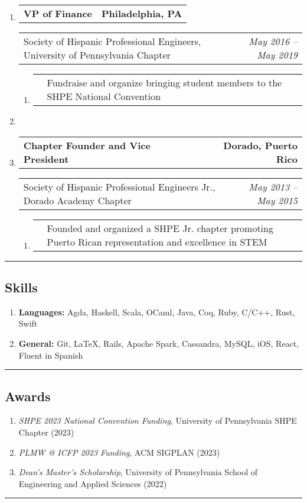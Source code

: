 \documentclass[letterpaper]{article}
\makeatletter
\newcommand*{\tabulardef}[3]{\begin{tabular}[t]{@{}lp{\dimexpr\linewidth-#1}@{}}
    #2&#3
\end{tabular}}
\newcommand{\headerrow}[2]
{\begin{tabular*}{\linewidth}{l@{\extracolsep{\fill}}r}
	#1 &
	#2 \\
\end{tabular*}}
\makeatother
\begin{document}
\begin{enumerate}[label=]
	\item
		\headerrow
			{\textbf{VP of Finance}}
			{\textbf{Philadelphia, PA}}
	\headerrow
		{Society of Hispanic Professional Engineers, University of Pennsylvania Chapter}
		{\emph{May 2016 -- May 2019}}
	\begin{enumerate}[label= *]
	\parskip=-0.1em
		\item\tabulardef{5cm}{}{Fundraise and organize bringing student members to the SHPE National Convention}
	\end{enumerate}

    \item

	\item
		\headerrow
			{\textbf{Chapter Founder and Vice President}}
			{\textbf{Dorado, Puerto Rico}}
	\headerrow
		{Society of Hispanic Professional Engineers Jr., Dorado Academy Chapter}
		{\emph{May 2013 -- May 2015}}
	\begin{enumerate}[label= *]
	\parskip=-0.1em
		\item\tabulardef{5cm}{}{Founded and organized a SHPE Jr. chapter promoting Puerto Rican representation and excellence in STEM}
	\end{enumerate}
\end{enumerate}

\hrule

\vspace{-0.6em}
\subsection*{Skills}
\begin{enumerate}[label=]
	\parskip=-0.25em

	\item
	\textbf{Languages: } Agda, Haskell, Scala, OCaml, Java, Coq, Ruby, C/C++, Rust, Swift

	\item
	\textbf{General: } Git, \LaTeX, Rails, Apache Spark, Cassandra, MySQL, iOS, React, Fluent in Spanish

\end{enumerate}


\hrule
\vspace{-0.6em}
\subsection*{Awards}
\begin{enumerate}[label=]
	\parskip=-0.25em

    \item \emph{SHPE 2023 National Convention Funding}, University of Pennsylvania SHPE Chapter (2023)
    \item \emph{PLMW @ ICFP 2023 Funding}, ACM SIGPLAN  (2023)
    \item \emph{Dean's Master's Scholarship}, University of Pennsylvania School of Engineering and Applied Sciences (2022)

\end{enumerate}

\hrule
\end{document}
